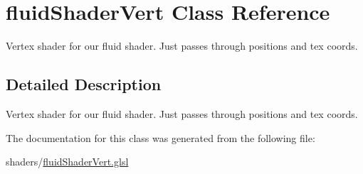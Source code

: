\hypertarget{classfluid_shader_vert}{\section{fluid\-Shader\-Vert Class Reference}
\label{classfluid_shader_vert}
}


Vertex shader for our fluid shader. Just passes through positions and tex coords.  




\subsection{Detailed Description}
Vertex shader for our fluid shader. Just passes through positions and tex coords. 

The documentation for this class was generated from the following file\-:\begin{DoxyCompactItemize}
\item 
shaders/\hyperlink{fluid_shader_vert_8glsl}{fluid\-Shader\-Vert.\-glsl}\end{DoxyCompactItemize}
